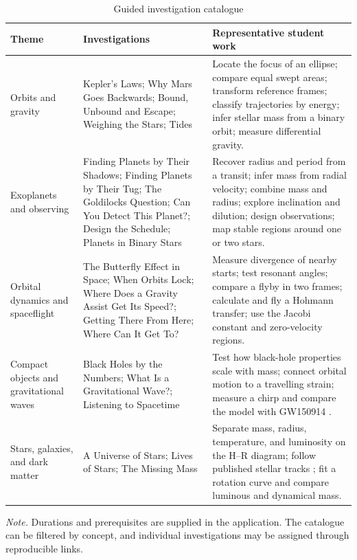 \documentclass[twocolumn]{aastex631}
\begin{document}
\begin{table}[t]
\caption{Guided investigation catalogue}
\label{tab:investigations}
\centering
\small
\renewcommand{\arraystretch}{1.12}
\begin{tabular}{p{}p{}p{}}
\hline\hline
\textbf{Theme} & \textbf{Investigations} & \textbf{Representative student work}\\
\hline
Orbits and gravity &
Kepler's Laws; Why Mars Goes Backwards; Bound, Unbound and Escape; Weighing the
Stars; Tides &
Locate the focus of an ellipse; compare equal swept areas; transform reference
frames; classify trajectories by energy; infer stellar mass from a binary
orbit; measure differential gravity.\\
Exoplanets and observing &
Finding Planets by Their Shadows; Finding Planets by Their Tug; The Goldilocks
Question; Can You Detect This Planet?; Design the Schedule; Planets in Binary
Stars &
Recover radius and period from a transit; infer mass from radial velocity;
combine mass and radius; explore inclination and dilution; design observations;
map stable regions around one or two stars.\\
Orbital dynamics and spaceflight &
The Butterfly Effect in Space; When Orbits Lock; Where Does a Gravity Assist Get
Its Speed?; Getting There From Here; Where Can It Get To? &
Measure divergence of nearby starts; test resonant angles; compare a flyby in
two frames; calculate and fly a Hohmann transfer; use the Jacobi constant and
zero-velocity regions.\\
Compact objects and gravitational waves &
Black Holes by the Numbers; What Is a Gravitational Wave?; Listening to
Spacetime &
Test how black-hole properties scale with mass; connect orbital motion to a
travelling strain; measure a chirp and compare the model with GW150914
\citep{abbott2016}.\\
Stars, galaxies, and dark matter &
A Universe of Stars; Lives of Stars; The Missing Mass &
Separate mass, radius, temperature, and luminosity on the H--R diagram; follow
published stellar tracks \citep{dotter2016,choi2016}; fit a rotation curve and
compare luminous and dynamical mass.\\
\hline
\end{tabular}
\vspace{3pt}

\parbox{0.95\textwidth}{\footnotesize\textit{Note.} Durations and prerequisites
are supplied in the application. The catalogue can be filtered by concept, and
individual investigations may be assigned through reproducible links.}
\end{table}
\end{document}
